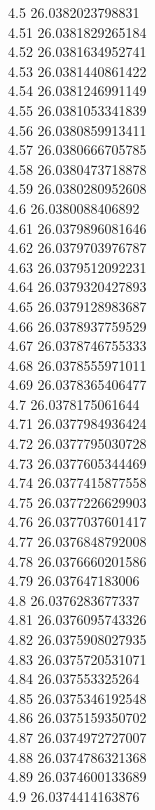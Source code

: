 {4.5	26.0382023798831\\
4.51	26.0381829265184\\
4.52	26.0381634952741\\
4.53	26.0381440861422\\
4.54	26.0381246991149\\
4.55	26.0381053341839\\
4.56	26.0380859913411\\
4.57	26.0380666705785\\
4.58	26.0380473718878\\
4.59	26.0380280952608\\
4.6	26.0380088406892\\
4.61	26.0379896081646\\
4.62	26.0379703976787\\
4.63	26.0379512092231\\
4.64	26.0379320427893\\
4.65	26.0379128983687\\
4.66	26.0378937759529\\
4.67	26.0378746755333\\
4.68	26.0378555971011\\
4.69	26.0378365406477\\
4.7	26.0378175061644\\
4.71	26.0377984936424\\
4.72	26.0377795030728\\
4.73	26.0377605344469\\
4.74	26.0377415877558\\
4.75	26.0377226629903\\
4.76	26.0377037601417\\
4.77	26.0376848792008\\
4.78	26.0376660201586\\
4.79	26.037647183006\\
4.8	26.0376283677337\\
4.81	26.0376095743326\\
4.82	26.0375908027935\\
4.83	26.0375720531071\\
4.84	26.037553325264\\
4.85	26.0375346192548\\
4.86	26.0375159350702\\
4.87	26.0374972727007\\
4.88	26.0374786321368\\
4.89	26.0374600133689\\
4.9	26.0374414163876\\
}
